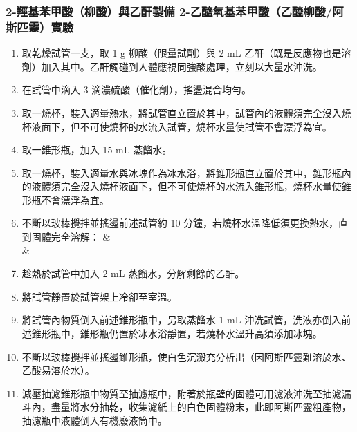 \documentclass[a4paper,12pt]{article}
\begin{document}
\subsubsection{2-羥基苯甲酸（柳酸）與乙酐製備 2-乙醯氧基苯甲酸（乙醯柳酸/阿斯匹靈）實驗}
\begin{enumerate}
\item 取乾燥試管一支，取 1 g 柳酸（限量試劑）與 2 mL 乙酐（既是反應物也是溶劑）加入其中。乙酐觸碰到人體應視同強酸處理，立刻以大量水沖洗。
\item 在試管中滴入 3 滴濃硫酸（催化劑），搖盪混合均勻。
\item 取一燒杯，裝入適量熱水，將試管直立置於其中，試管內的液體須完全沒入燒杯液面下，但不可使燒杯的水流入試管，燒杯水量使試管不會漂浮為宜。
\item 取一錐形瓶，加入 15 mL 蒸餾水。
\item 取一燒杯，裝入適量水與冰塊作為冰水浴，將錐形瓶直立置於其中，錐形瓶內的液體須完全沒入燒杯液面下，但不可使燒杯的水流入錐形瓶，燒杯水量使錐形瓶不會漂浮為宜。
\item 不斷以玻棒攪拌並搖盪前述試管約 10 分鐘，若燒杯水溫降低須更換熱水，直到固體完全溶解：
\bma
& \\
\tx{\ce{->[\ce{H2SO4}]}} & 
\eam
\item 趁熱於試管中加入 2 mL 蒸餾水，分解剩餘的乙酐。
\item 將試管靜置於試管架上冷卻至室溫。
\item 將試管內物質倒入前述錐形瓶中，另取蒸餾水 1 mL 沖洗試管，洗液亦倒入前述錐形瓶中，錐形瓶仍置於冰水浴靜置，若燒杯水溫升高須添加冰塊。
\item 不斷以玻棒攪拌並搖盪錐形瓶，使白色沉澱充分析出（因阿斯匹靈難溶於水、乙酸易溶於水）。
\item 減壓抽濾錐形瓶中物質至抽濾瓶中，附著於瓶壁的固體可用濾液沖洗至抽濾漏斗內，盡量將水分抽乾，收集濾紙上的白色固體粉末，此即阿斯匹靈粗產物，抽濾瓶中液體倒入有機廢液筒中。
\end{enumerate}
\end{document}
